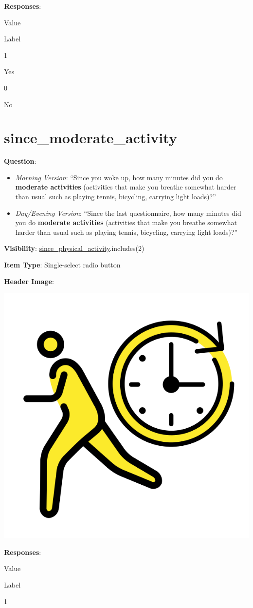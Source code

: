 \documentclass[]{book}
\providecommand{\tightlist}{%
  \setlength{\itemsep}{0pt}\setlength{\parskip}{0pt}}
\begin{document}
\textbf{Responses}:

Value

Label

1

Yes

0

No

\hypertarget{since_moderate_activity}{%
\section{since\_moderate\_activity}\label{since_moderate_activity}}

\textbf{Question}:

\begin{itemize}
\tightlist
\item
  \emph{Morning Version}: ``Since you woke up, how many minutes did you do \textbf{moderate activities} (activities that make you breathe somewhat harder than usual such as playing tennis, bicycling, carrying light loads)?''
\item
  \emph{Day/Evening Version}: ``Since the last questionnaire, how many minutes did you do \textbf{moderate activities} (activities that make you breathe somewhat harder than usual such as playing tennis, bicycling, carrying light loads)?''
\end{itemize}

\textbf{Visibility}: \protect\hyperlink{since_physical_activity}{since\_physical\_activity}.includes(2)

\textbf{Item Type}: Single-select radio button

\textbf{Header Image}:

\begin{flushleft}\includegraphics[width=0.33\linewidth]{downloadFigs4latex_NIMH_Applet_Codebook/since_moderate_activity_headerImg} \end{flushleft}

\textbf{Responses}:

Value

Label

1
\end{document}
